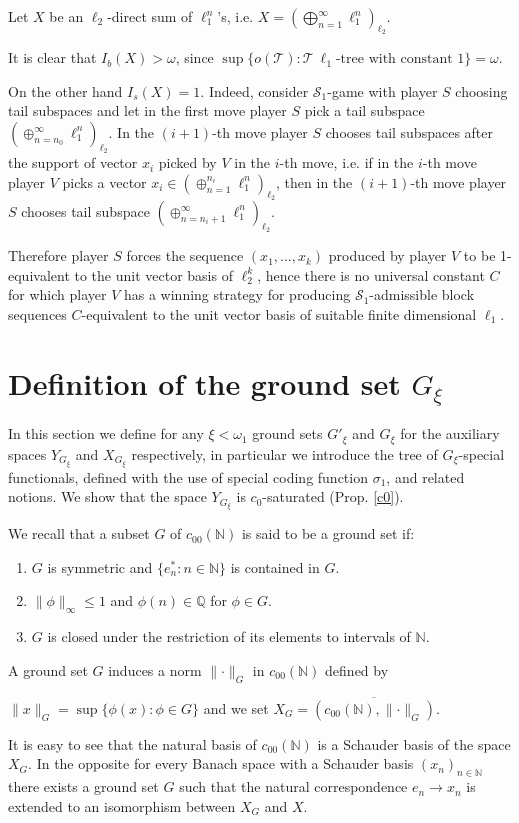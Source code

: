 \documentclass[a4paper]{amsart}
\theoremstyle{plain}
\newcommand{\N}{\mathbb{N}}
\newcommand{\Q}{\mathbb{Q}}
\newcommand{\mc}{\mathcal}
\newcommand{\norm}[1][\cdot]{\lVert #1\rVert}
\newcommand{\xn}[1][x]{(#1_{n})_{n\in\N}}
\begin{document}
Let $X$ be an $\ell_{2}$-direct sum of $\ell_{1}^{n}$'s, i.e.
$X=\left(\bigoplus_{n=1}^{\infty}\ell_{1}^n\right)_{\ell_{2}}$.


It is clear that $I_b(X)>\omega$, since $\sup\{o(\mc{T}): \mc{T} \ \ell_{1}\text{-tree
with constant } 1\}=\omega$.

On the other hand $I_s(X)=1$. Indeed, consider $\mc{S}_1$-game with player $S$ choosing
tail subspaces and let in the first move player $S$ pick a tail subspace
$(\oplus_{n=n_0}^\infty\ell_{1}^n)_{\ell_2}$. In the $(i+1)$-th move player $S$ chooses
tail subspaces after the support of vector $x_i$ picked by $V$ in the $i$-th move, i.e.
if in the $i$-th move player $V$ picks a vector
$x_i\in(\oplus_{n=1}^{n_i}\ell_{1}^n)_{\ell_2}$, then in the $(i+1)$-th move player $S$
chooses tail subspace $(\oplus_{n=n_i+1}^\infty\ell_{1}^n)_{\ell_2}$.

Therefore player $S$ forces the sequence $(x_1,\dots,x_k)$ produced by player $V$ to be
1-equivalent to the unit vector basis of $\ell_2^k$, hence there is no universal constant
$C$ for which player $V$ has a winning strategy for producing $\mc{S}_1$-admissible block sequences
$C$-equivalent to the unit vector basis of suitable finite dimensional $\ell_{1}$.
\section{Definition of the ground set $G_{\xi}$}\label{sec4}
In this section we define for any $\xi<\omega_1$ ground sets $G'_\xi$ and $G_\xi$ for the
auxiliary spaces $Y_{G_\xi}$ and $X_{G_\xi}$ respectively, in particular we introduce the
tree of $G_\xi$-special functionals, defined with the use of special coding function
$\sigma_1$, and related notions. We show that the space $Y_{G_\xi}$ is $c_0$-saturated
(Prop. \ref{c0}).

We recall that a  subset $G$ of $c_{00}(\N)$  is said to be a ground set if:
\begin{enumerate}
 \item  $G$ is symmetric and  $\{e_{n}^{*}:n\in\N\}$ is contained in $G$.
\item $\norm[\phi]_{\infty}\leq 1$ and $\phi(n)\in\Q$ for $\phi\in G$.
\item $G$ is closed under the restriction of its elements to intervals of $\N$.
\end{enumerate}
 A ground set $G$ induces a norm $\norm_{G}$ in $c_{00}(\N)$ defined by
\begin{center} $\norm[x]_{G}=\sup\{\phi(x):\phi\in G\}$ and we set
$X_{G}=\overline{( c_{00}(\N), \norm_{G})}$.
\end{center}
It is easy to see that the natural basis of $c_{00}(\N)$ is a Schauder
basis of the space $X_{G}$.  In the opposite for every Banach space with a Schauder basis $\xn$ there exists a ground set $G$ such that  the natural correspondence $e_{n}\to x_{n}$ is extended to an isomorphism between
$X_{G}$ and $X$.
\end{document}
